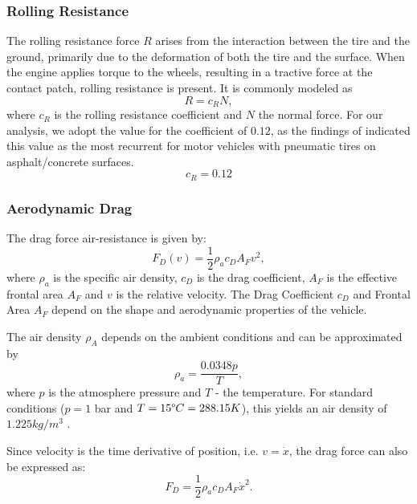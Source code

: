 \subsubsection*{Rolling Resistance}
	The rolling resistance force $R$ arises from the interaction between the tire and the ground, primarily due to the deformation of both the tire and the surface. When the engine applies torque to the wheels, resulting in a tractive force at the contact patch, rolling resistance is present. It is commonly modeled as
	\begin{equation*}
		R = c_R N,
	\end{equation*}
	where $c_R$ is the rolling resistance coefficient and $N$ the normal force. For our analysis, we adopt the value for the coefficient of $0.12$, as the findings of \parencite{wargula2019determination} indicated this value as the most recurrent for motor vehicles with pneumatic tires on asphalt/concrete surfaces.
	\begin{equation*}
		c_R = 0.12
	\end{equation*}
	
\subsubsection*{Aerodynamic Drag}
	The drag force air-resistance is given by: 
	\begin{equation*}
		F_D(v) = \frac{1}{2}\rho_a c_D A_F v^2,
	\end{equation*}
	where $\rho_a$ is the specific air density, $c_D$ is the drag coefficient, $A_F$ is the effective frontal area $A_F$ and $v$ is the relative velocity. The Drag Coefficient $c_D$ and Frontal Area $A_F$ depend on the shape and aerodynamic properties of the vehicle.
	
	The air density $\rho_A$ depends on the ambient conditions and can be approximated by 
	\begin{equation*}
		\rho_a = \frac{0.0348p}{T},
	\end{equation*}
	where $p$ is the atmosphere pressure and $T$ - the temperature. For standard conditions ($p= 1$ bar and $T= 15\degree C=288.15K$), this yields an air density of $1.225kg/m^3$ \parencite[p. 135]{mashadi2012vehicle}. 
	
	Since velocity is the time derivative of position, i.e. $v=\dot x$, the drag force can also be expressed as:
	\begin{equation*}
    	F_D = \frac{1}{2}\rho_a c_D A_F \dot x^2.
	\end{equation*}

